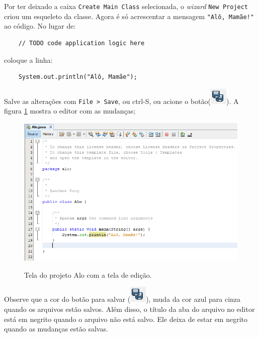 \documentclass[
	12pt,				%
	twoside,			%
	a4paper,			%
	english,			%
	french,				%
	spanish,			%
	brazil				%
	]{abntex2}
\begin{document}
Por ter deixado a caixa \texttt{Create Main Class} selecionada, o \textit{wizard} \texttt{New Project} criou um esqueleto da classe. Agora é só acrescentar a mensagem \texttt{"Alô, Mamãe!"} ao código.
No lugar de:
\begin{verbatim}
    // TODO code application logic here
\end{verbatim}
coloque a linha:
\begin{verbatim}
    System.out.println("Alô, Mamãe");
\end{verbatim}
Salve as alterações com \texttt{File > Save}, ou ctrl-S, ou acione o botão(\includegraphics[scale=0.4]{botaoS.png}). A figura \ref{fig:code} mostra o editor com as mudanças;

\begin{figure}[h]
\begin{center}
\includegraphics[scale=0.4]{codeAlo.png} 
\caption{Tela do projeto Alo com a tela de edição.}
\label{fig:code}
\end{center}
\end{figure}

Observe que a cor do botão para salvar (\includegraphics[scale=0.4]{botaoS.png}), muda da cor azul para cinza quando os arquivos estão salvos. Além disso, o título da aba do arquivo no editor está em negrito quando o arquivo não está salvo. Ele deixa de estar em negrito quando as mudanças estão salvas.
\end{document}
